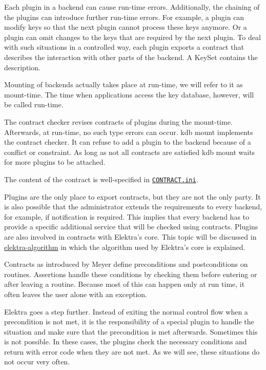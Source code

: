 Each plugin in a backend can cause run-\/time errors. Additionally, the chaining of the plugins can introduce further run-\/time errors. For example, a plugin can modify keys so that the next plugin cannot process these keys anymore. Or a plugin can omit changes to the keys that are required by the next plugin. To deal with such situations in a controlled way, each plugin exports a contract that describes the interaction with other parts of the backend. A {\ttfamily Key\+Set} contains the description.

Mounting of backends actually takes place at run-\/time, we will refer to it as mount-\/time. The time when applications access the key database, however, will be called run-\/time.

The contract checker revises contracts of plugins during the mount-\/time. Afterwards, at run-\/time, no such type errors can occur. {\ttfamily kdb mount} implements the contract checker. It can refuse to add a plugin to the backend because of a conflict or constraint. As long as not all contracts are satisfied {\ttfamily kdb mount} waits for more plugins to be attached.

The content of the contract is well-\/specified in \href{/home/jenkins/workspace/libelektra-release/doc/CONTRACT.ini}{\tt C\+O\+N\+T\+R\+A\+C\+T.\+ini}.

Plugins are the only place to export contracts, but they are not the only party. It is also possible that the administrator extends the requirements to every backend, for example, if notification is required. This implies that every backend has to provide a specific additional service that will be checked using contracts. Plugins are also involved in contracts with Elektra’s core. This topic will be discussed in \hyperlink{doc_dev_algorithm_md}{elektra-\/algorithm} in which the algorithm used by Elektra’s core is explained.

Contracts as introduced by Meyer define preconditions and postconditions on routines. Assertions handle these conditions by checking them before entering or after leaving a routine. Because most of this can happen only at run time, it often leaves the user alone with an exception.

Elektra goes a step further. Instead of exiting the normal control flow when a precondition is not met, it is the responsibility of a special plugin to handle the situation and make sure that the precondition is met afterwards. Sometimes this is not possible. In these cases, the plugins check the necessary conditions and return with error code when they are not met. As we will see, these situations do not occur very often.

